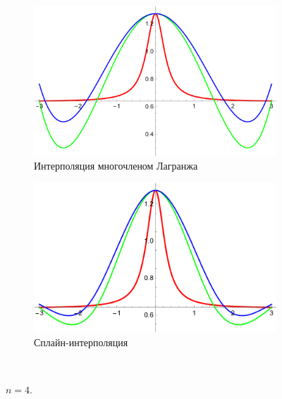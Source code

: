 \documentclass[12pt, a4paper]{article}
\begin{document}
	\begin{figure}[H]
		\centering
		\begin{subfigure}{0.4\textwidth}
			\includegraphics[width=\textwidth]{3_l4}
			\caption{Интерполяция многочленом Лагранжа}
		\end{subfigure}
		\hfill
		\begin{subfigure}{0.4\textwidth}
			\includegraphics[width=\textwidth]{3_s4}
			\caption{Сплайн-интерполяция}
		\end{subfigure}
		\hfill
		\\[0.5cm]
		\caption{$n = 4$.}
		\label{fig:figures}
	\end{figure}
	
\end{document}
